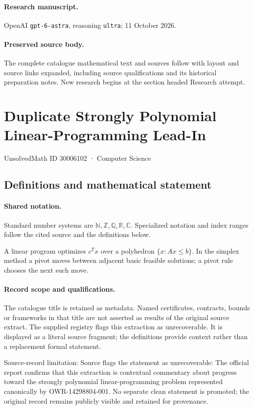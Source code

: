 \documentclass[11pt]{article}
\begin{document}
\paragraph{Research manuscript.} OpenAI \texttt{gpt-6-astra}, reasoning \texttt{ultra}; 11 October 2026.
\paragraph{Preserved source body.} The complete catalogue mathematical text and sources follow with layout and source links expanded, including source qualifications and its historical preparation notes. New research begins at the section headed Research attempt.

\section{Duplicate Strongly Polynomial Linear-Programming Lead-In}\label{30006102}
{\small UnsolvedMath ID 30006102 · Computer Science}
\subsection{Definitions and mathematical statement}

\paragraph{Shared notation.}Standard number systems are $\mathbb N,\mathbb Z,\mathbb Q,\mathbb R,\mathbb C$. Specialized notation and index ranges follow the cited source and the definitions below.


A linear program optimizes $c^Tx$ over a polyhedron $\{x:Ax\leq b\}$. In the simplex method a pivot moves between adjacent basic feasible solutions; a pivot rule chooses the next such move.
\paragraph{Record scope and qualifications.}
The catalogue title is retained as metadata. Named certificates, contracts, bounds or frameworks in that title are not asserted as results of the original source extract.
The supplied registry flags this extraction as unrecoverable. It is displayed as a literal source fragment; the definitions provide context rather than a replacement formal statement.

Source-record limitation: Source flags the statement as unrecoverable: The official report confirms that this extraction is contextual commentary about progress toward the strongly polynomial linear-programming problem represented canonically by OWR-14298804-001. No separate clean statement is promoted; the original record remains publicly visible and retained for provenance.
\end{document}
